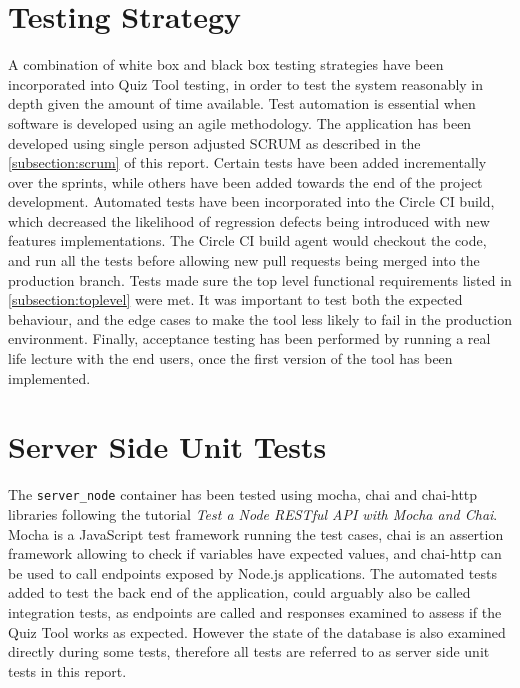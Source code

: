 \section{Testing Strategy}
A combination of white box and black box testing strategies have been incorporated
into Quiz Tool testing, in order to test the system reasonably in depth
given the amount of time available. Test automation is essential when software is developed
using an agile methodology. The application has been developed using single person adjusted
SCRUM as described in the \autoref{subsection:scrum} of this report. Certain tests have been
added incrementally over the sprints, while others have been added towards the end of the
project development. Automated tests have been incorporated into the Circle CI build,
which decreased the likelihood of regression defects being introduced with new features implementations.
The Circle CI build agent would checkout the code, and run all the tests before allowing
new pull requests being merged into the production branch. Tests made sure the
top level functional requirements listed in \autoref{subsection:toplevel} were met.
It was important to test both the expected behaviour, and the edge cases to make the
tool less likely to fail in the production environment. Finally, acceptance testing
has been performed by running a real life lecture with the end users, once the first version of the
tool has been implemented.

\section{Server Side Unit Tests}
The \texttt{server\_node} container has been tested using mocha\cite{59}, chai\cite{60} and chai-http\cite{61}
libraries following the tutorial \textit{Test a Node RESTful API with Mocha and Chai}\cite{62}.
Mocha is a JavaScript test framework running the test cases, chai is an assertion framework allowing to check if
variables have expected values, and chai-http can be used to call endpoints exposed by Node.js
applications. The automated tests added to test the back end of the application, could arguably
also be called integration tests, as endpoints are called and responses examined to assess if
the Quiz Tool works as expected. However the state of the database is also examined directly
during some tests, therefore all tests are referred to as server side unit tests in this report.

